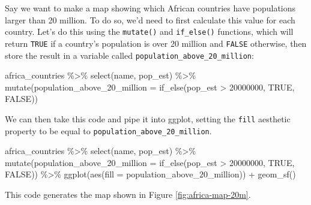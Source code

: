 \documentclass[
]{book}
\newenvironment{Shaded}{\begin{snugshade}}{\end{snugshade}}
\newcommand{\AttributeTok}[1]{\textcolor[rgb]{0.77,0.63,0.00}{#1}}
\newcommand{\ConstantTok}[1]{\textcolor[rgb]{0.00,0.00,0.00}{#1}}
\newcommand{\DecValTok}[1]{\textcolor[rgb]{0.00,0.00,0.81}{#1}}
\newcommand{\FunctionTok}[1]{\textcolor[rgb]{0.00,0.00,0.00}{#1}}
\newcommand{\NormalTok}[1]{#1}
\newcommand{\SpecialCharTok}[1]{\textcolor[rgb]{0.00,0.00,0.00}{#1}}
\begin{document}
Say we want to make a map showing which African countries have populations larger than 20 million. To do so, we'd need to first calculate this value for each country. Let's do this using the \texttt{mutate()} and \texttt{if\_else()} functions, which will return \texttt{TRUE} if a country's population is over 20 million and \texttt{FALSE} otherwise, then store the result in a variable called \texttt{population\_above\_20\_million}:

\begin{Shaded}
\begin{Highlighting}[]
\NormalTok{africa\_countries }\SpecialCharTok{\%\textgreater{}\%} 
  \FunctionTok{select}\NormalTok{(name, pop\_est) }\SpecialCharTok{\%\textgreater{}\%} 
  \FunctionTok{mutate}\NormalTok{(}\AttributeTok{population\_above\_20\_million =} \FunctionTok{if\_else}\NormalTok{(pop\_est }\SpecialCharTok{\textgreater{}} \DecValTok{20000000}\NormalTok{, }\ConstantTok{TRUE}\NormalTok{, }\ConstantTok{FALSE}\NormalTok{))}
\end{Highlighting}
\end{Shaded}

We can then take this code and pipe it into ggplot, setting the \texttt{fill} aesthetic property to be equal to \texttt{population\_above\_20\_million}.

\begin{Shaded}
\begin{Highlighting}[]
\NormalTok{africa\_countries }\SpecialCharTok{\%\textgreater{}\%} 
  \FunctionTok{select}\NormalTok{(name, pop\_est) }\SpecialCharTok{\%\textgreater{}\%} 
  \FunctionTok{mutate}\NormalTok{(}\AttributeTok{population\_above\_20\_million =} \FunctionTok{if\_else}\NormalTok{(pop\_est }\SpecialCharTok{\textgreater{}} \DecValTok{20000000}\NormalTok{, }\ConstantTok{TRUE}\NormalTok{, }\ConstantTok{FALSE}\NormalTok{)) }\SpecialCharTok{\%\textgreater{}\%} 
  \FunctionTok{ggplot}\NormalTok{(}\FunctionTok{aes}\NormalTok{(}\AttributeTok{fill =}\NormalTok{ population\_above\_20\_million)) }\SpecialCharTok{+}
  \FunctionTok{geom\_sf}\NormalTok{()}
\end{Highlighting}
\end{Shaded}

This code generates the map shown in Figure \ref{fig:africa-map-20m}.
\end{document}

